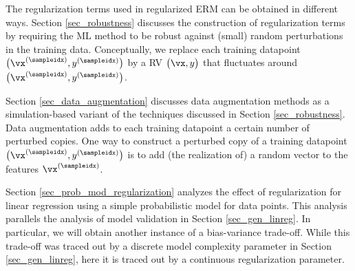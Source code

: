 \documentclass[12pt]{report}
\begin{document}

The regularization terms used in regularized ERM can be obtained in different ways. 
Section \ref{sec_robustness} discusses the construction of regularization terms 
by requiring the ML method to be robust against (small) random perturbations in 
the training data. Conceptually, we replace each training datapoint $\big(\vx^{(\sampleidx)},y^{(\sampleidx)}\big)$ 
by a RV $\big(\vx,y\big)$ that fluctuates around $\big(\vx^{(\sampleidx)},y^{(\sampleidx)}\big)$. 

Section \ref{sec_data_augmentation} discusses data augmentation methods as 
a simulation-based variant of the techniques discussed in Section \ref{sec_robustness}. 
Data augmentation adds to each training datapoint a certain number of perturbed 
copies. One way to construct a perturbed copy of a training datapoint $\big(\vx^{(\sampleidx)},y^{(\sampleidx)}\big)$ 
is to add (the realization of) a random vector to the features $\vx^{(\sampleidx)}$. 

Section \ref{sec_prob_mod_regularization} analyzes the effect of regularization 
for linear regression using a simple probabilistic model for data points. This 
analysis parallels the analysis of model validation in Section \ref{sec_gen_linreg}. 
In particular, we will obtain another instance of a bias-variance trade-off. While 
this trade-off was traced out by a discrete model complexity parameter 
in Section \ref{sec_gen_linreg}, here it is traced out by a continuous 
regularization parameter. 
\end{document}

